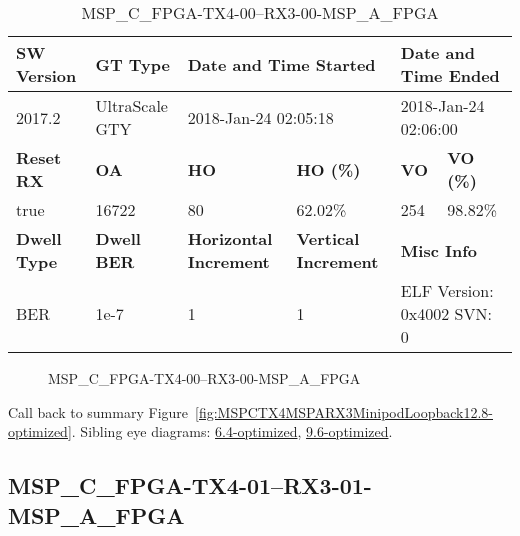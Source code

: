 \begin{table}[h]
\centering
\caption{MSP\_C\_FPGA-TX4-00--RX3-00-MSP\_A\_FPGA}
\label{tab:MSPCFPGATX400RX300MSPAFPGA12.8-optimized}
\begin{tabular}{@{}|l|l|l|l|l|l|@{}}
\toprule
\textbf{SW Version}                & \textbf{GT Type}   & \multicolumn{2}{l|}{\textbf{Date and Time Started}}            & \multicolumn{2}{l|}{\textbf{Date and Time Ended}}        \\ \midrule
2017.2                       & UltraScale GTY          & \multicolumn{2}{l|}{2018-Jan-24 02:05:18}                   & \multicolumn{2}{l|}{2018-Jan-24 02:06:00}               \\ \midrule
\textbf{Reset RX}                  & \textbf{OA} & \textbf{HO}   & \textbf{HO (\%)} & \textbf{VO} & \textbf{VO (\%)} \\ \midrule
true & 16722        & 80          & 62.02\%        & 254        & 98.82\%       \\ \midrule
\textbf{Dwell Type}                & \textbf{Dwell BER} & \textbf{Horizontal Increment} & \textbf{Vertical Increment}    & \multicolumn{2}{l|}{\textbf{Misc Info}}                  \\ \midrule
BER                            & 1e-7        & 1        & 1           & \multicolumn{2}{l|}{ELF Version: 0x4002 SVN: 0}                         \\ \bottomrule
\end{tabular}
\end{table}

\begin{figure}[h]
\caption{MSP\_C\_FPGA-TX4-00--RX3-00-MSP\_A\_FPGA} \label{fig:MSPCFPGATX400RX300MSPAFPGA12.8-optimized}
\end{figure}

Call back to summary Figure~\ref{fig:MSPCTX4MSPARX3MinipodLoopback12.8-optimized}.
Sibling eye diagrams: \hyperref[sec:MSPCFPGATX400RX300MSPAFPGA6.4-optimized]{6.4-optimized}, \hyperref[sec:MSPCFPGATX400RX300MSPAFPGA9.6-optimized]{9.6-optimized}.

\clearpage
\newpage


\subsection{MSP\_C\_FPGA-TX4-01--RX3-01-MSP\_A\_FPGA}\label{sec:MSPCFPGATX401RX301MSPAFPGA12.8-optimized}

